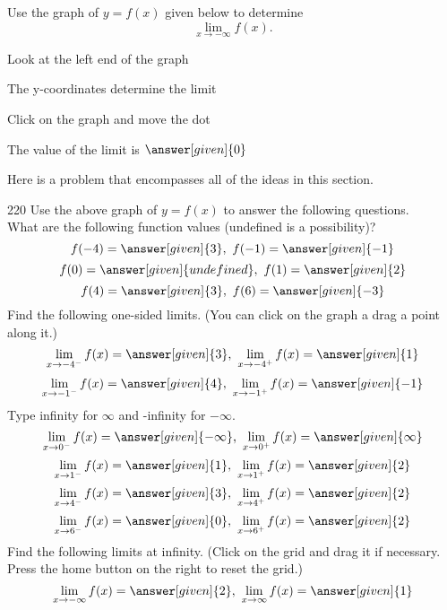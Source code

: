 \documentclass{ximera}
\begin{document}
\begin{problem} %

  Use the graph of $y = f(x)$ given below to determine
  \[
  \lim_{x\to -\infty} f(x).
  \]
  
    \begin{hint}
      Look at the left end of the graph
    \end{hint}
    \begin{hint}
      The y-coordinates determine the limit
    \end{hint}
		\begin{hint}
		  Click on the graph and move the dot
		\end{hint}
		The value of the limit is
		 $\answer[given]{0}$

	
\end{problem}

Here is a problem that encompasses all of the ideas in this section.

\begin{problem} %
	\begin{leash}{220}
	Use the above graph of $y = f(x)$ to answer the following questions.\\
	
  
  What are the following function values (undefined is a possibility)?  
		 \[f(-4) = \answer[given]{3}, \ f(-1) = \answer[given]{-1} \]
		 \[f(0) = \answer[given]{undefined}, \ f(1) = \answer[given]{2} \]
	   \[f(4) = \answer[given]{3}, \ f(6) = \answer[given]{-3} \]
	Find the following one-sided limits. (You can click on the graph a drag a point along it.)
	\[\lim_{x\to -4^-} f(x) = \answer[given]{3}, \ \lim_{x\to -4^+} f(x) = \answer[given]{1}\]
	\[\lim_{x\to -1^-} f(x) = \answer[given]{4}, \ \lim_{x\to -1^+} f(x) = \answer[given]{-1}\]
	Type infinity for $\infty$ and -infinity for $-\infty$.
	\[\lim_{x\to 0^-} f(x) = \answer[given]{-\infty}, \ \lim_{x\to 0^+} f(x) = \answer[given]{\infty}\]
	\[\lim_{x\to 1^-} f(x) = \answer[given]{1}, \ \lim_{x\to 1^+} f(x) = \answer[given]{2}\]
	\[\lim_{x\to 4^-} f(x) = \answer[given]{3}, \ \lim_{x\to 4^+} f(x) = \answer[given]{2}\]
	\[\lim_{x\to 6^-} f(x) = \answer[given]{0}, \ \lim_{x\to 6^+} f(x) = \answer[given]{2}\]
	Find the following limits at infinity. (Click on the grid and drag it if necessary.  
	Press the home button on the right to reset the grid.)
	\[\lim_{x\to -\infty} f(x) = \answer[given]{2}, \ \lim_{x\to \infty} f(x) = \answer[given]{1}\]
	
	\end{leash}
\end{problem}
\end{document}
